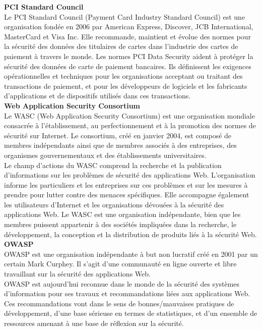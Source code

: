 \textbf{\RIGHTarrow PCI Standard Council}\\
Le PCI Standard Council (Payment Card Industry Standard Council)  est une organisation fondée en 2006 par American Express, Discover, JCB International, MasterCard et Visa Inc. Elle recommande, maintient et évolue des normes pour la sécurité des données des titulaires de cartes dans l'industrie des cartes de paiement à travers le monde. Les normes PCI Data Security aident à protéger la sécurité des données de carte de paiement bancaires. Ils définissent les exigences opérationnelles et techniques pour les organisations acceptant ou traitant des transactions de paiement, et pour les développeurs de logiciels et les fabricants d'applications et de dispositifs utilisés dans ces transactions.\\

\textbf{\RIGHTarrow Web Application Security Consortium}\\
Le WASC (Web Application Security Consortium)  est une organisation mondiale consacrée à l'établissement, au perfectionnement et à la promotion des normes de sécurité sur Internet. Le consortium, créé en janvier 2004, est composé de membres indépendants ainsi que de membres associés à des entreprises, des organismes gouvernementaux et des établissements universitaires.\\
Le champ d'actions du WASC comprend la recherche et la publication d'informations sur les problèmes de sécurité des applications Web. L’organisation informe les particuliers et les entreprises sur ces problèmes et sur les mesures à prendre pour lutter contre des menaces spécifiques. Elle accompagne également les utilisateurs d’Internet et les organisations dévouées à la sécurité des applications Web. Le WASC est une organisation indépendante, bien que les membres puissent appartenir à des sociétés impliquées dans la recherche, le développement, la conception et la distribution de produits liés à la sécurité Web.\\

\textbf{\RIGHTarrow OWASP}\\
OWASP est une organisation indépendante à but non lucratif créé en 2001 par un certain Mark Curphey. Il s'agit d'une communauté en ligne ouverte et libre travaillant sur la sécurité des applications Web.\\
OWASP est aujourd'hui reconnue dans le monde de la sécurité des systèmes d'information pour ses travaux et recommandations liées aux applications Web. Ces recommandations vont dans le sens de bonnes/mauvaises pratiques de développement, d’une base sérieuse en termes de statistiques, et d’un ensemble de ressources amenant à une base de réflexion sur la sécurité.\\

